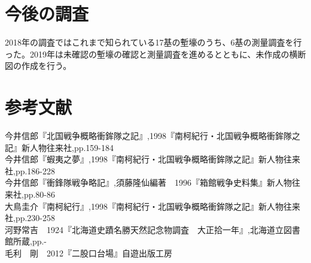 \documentclass[14Q]{jsarticle}
\begin{document}
\section{今後の調査}
2018年の調査ではこれまで知られている17基の塹壕のうち、6基の測量調査を行った。2019年は未確認の塹壕の確認と測量調査を進めるとともに、未作成の横断図の作成を行う。


\section*{参考文献}
\noindent
今井信郎『北国戦争概略衝鉾隊之記』,1998『南柯紀行・北国戦争概略衝鉾隊之記』新人物往来社,pp.159-184\\
今井信郎『蝦夷之夢』,1998『南柯紀行・北国戦争概略衝鉾隊之記』新人物往来社,pp.186-228\\
今井信郎『衝鋒隊戦争略記』,須藤隆仙編著　1996『箱館戦争史料集』新人物往来社,pp.80-86\\
大鳥圭介『南柯紀行』,1998『南柯紀行・北国戦争概略衝鉾隊之記』新人物往来社,pp.230-258\\
河野常吉　1924『北海道史蹟名勝天然記念物調査　大正拾一年』,北海道立図書館所蔵,pp.-\\
毛利　剛　2012『二股口台場』自遊出版工房
\end{document}

